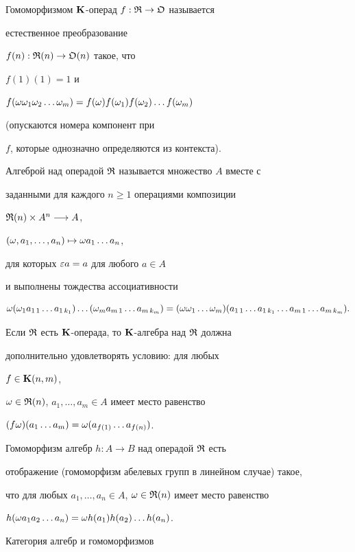Гомоморфизмом $\P$-операд $f : \R \to \Oo $ называется


естественное преобразование


$f(n): \R(n)\to \Oo (n)$ такое, что


$f(1)(1)=1$ и


$f(\o\o_1\o_2\dotsc\o_m)=f(\o)f(\o_1)f(\o_2)\dotsc f(\o_m)$


(опускаются номера компонент при


$f$, которые однозначно определяются из контекста).





Алгеброй над операдой $\R$ называется множество $A$ вместе с


заданными для каждого $n\ge 1$ операциями композиции


$\R(n) \times A^{n}\ar{} A$,


$(\o, a_1,\dotsc, a_n) \mapsto \o a_1 \dotsc a_n$,


для которых $\ep a =a$ для любого $a\in A$


и выполнены тождества ассоциативности


$$


\o (\o_1 a_{1\,1} \dotsc a_{1\,k_1})\dotsc


(\o_m a_{m\, 1} \dotsc a_{m\, k_m}) =


(\o \o_1\dotsc \o_m)(a_{1\,1}\dotsc a_{1\,k_1}\dotsc


a_{m\,1} \dotsc a_{m\,k_m}).


$$


Если $\R$ есть $\P$-операда, то $\P$-алгебра над $\R$ должна


дополнительно удовлетворять условию: для любых


$f\in \P(n,m)$,


$\o\in \R(n)$, $a_1,\dotsc, a_m\in A$ имеет место равенство


$(f\o)(a_1\dotsc a_m)=\o(a_{f(1)}\dotsc a_{f(n)})$.





Гомоморфизм алгебр $h: A\to B$ над операдой $\R$ есть


отображение (гомоморфизм абелевых групп в линейном случае) такое,


что для любых $a_1,\dotsc, a_n\in A$, $\o\in \R(n)$ имеет место равенство


$h(\o a_1 a_2 \dotsc a_n)=\o h(a_1)h(a_2) \dotsc h(a_n) $.


Категория алгебр и гомоморфизмов


